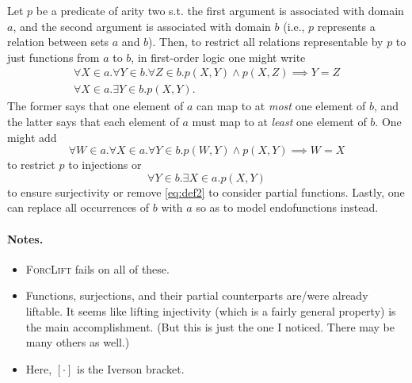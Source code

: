 \documentclass{article}
\theoremstyle{definition}
\theoremstyle{remark}
\begin{document}
Let $p$ be a predicate of arity two s.t. the first argument is associated with domain $a$, and the second argument is associated with domain $b$ (i.e., $p$ represents a relation between sets $a$ and $b$). Then, to restrict all relations representable by $p$ to just functions from $a$ to $b$, in first-order logic one might write
\begin{gather}
  \forall X \in a. \forall Y \in b. \forall Z \in b. p(X, Y) \land p(X, Z) \implies Y = Z \label{eq:def1} \\
  \forall X \in a. \exists Y \in b. p(X, Y). \label{eq:def2}
\end{gather}
The former says that one element of $a$ can map to at \emph{most} one element of $b$, and the latter says that each element of $a$ must map to at \emph{least} one element of $b$. One might add
\begin{equation} \label{eq:injectivity}
  \forall W \in a. \forall X \in a. \forall Y \in b. p(W, Y) \land p(X, Y) \implies W = X
\end{equation}
to restrict $p$ to injections or
\begin{equation}
  \forall Y \in b. \exists X \in a. p(X, Y)
\end{equation}
to ensure surjectivity or remove \cref{eq:def2} to consider partial functions. Lastly, one can replace all occurrences of $b$ with $a$ so as to model endofunctions instead.

\paragraph{Notes.}
\begin{itemize}
\item \textsc{ForcLift} fails on all of these.
\item Functions, surjections, and their partial counterparts are/were already liftable. It seems like lifting injectivity (which is a fairly general property) is the main accomplishment. (But this is just the one I noticed. There may be many others as well.)
\item Here, $[\cdot]$ is the Iverson bracket.
\end{itemize}
\end{document}
